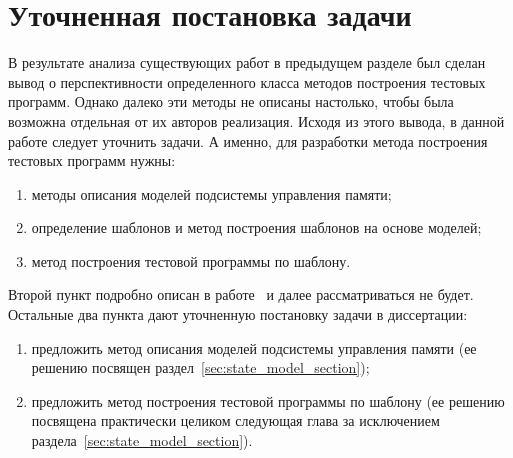 %
%


\section{Уточненная постановка задачи}

В результате анализа существующих работ в предыдущем разделе был сделан вывод о перспективности определенного класса методов построения тестовых программ. Однако далеко эти методы не описаны настолько, чтобы была возможна отдельная от их авторов реализация. Исходя из этого вывода, в данной работе следует уточнить задачи. А именно, для разработки метода построения тестовых программ нужны:
\begin{enumerate}
	\item методы описания моделей подсистемы управления памяти;
	\item определение шаблонов и метод построения шаблонов на основе моделей;
	\item метод построения тестовой программы по шаблону.
\end{enumerate}

Второй пункт подробно описан в работе~\cite{MicroTESK} и далее рассматриваться не будет. Остальные два пункта дают уточненную постановку задачи в диссертации:
\begin{enumerate}
	\item предложить метод описания моделей подсистемы управления памяти (ее решению посвящен раздел~\ref{sec:state_model_section});
	\item предложить метод построения тестовой программы по шаблону (ее решению посвящена практически целиком следующая глава за исключением раздела~\ref{sec:state_model_section}).
\end{enumerate}

